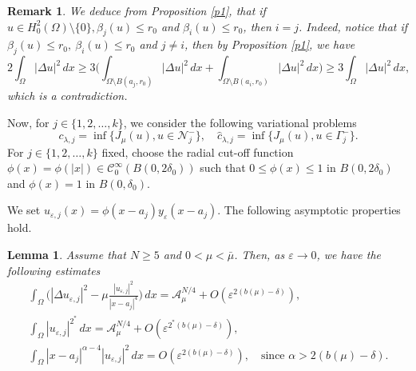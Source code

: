 \documentclass[10pt,a4paper]{amsart}
\numberwithin{equation}{section}
\newtheorem{lemma}[theorem]{Lemma}
\newtheorem{remark}[theorem]{Remark}
\begin{document}
 \begin{remark}\label{RM} \rm
We deduce from Proposition \ref{p1}, that if 
\(u\in H^2_0(\Omega)\setminus\{0\}, \beta_j(u)\leq r_0\)  and \(\beta_i(u)\leq r_0\),
then \(i=j\). Indeed, notice that if \( \beta_j(u)\leq r_0, \ \beta_i(u)\leq r_0\) 
and \(j\neq i\), then by Proposition \ref{p1}, we have
 \[
 2\int_{\Omega} |\Delta u|^2\,dx 
 \geq 3 \Big( \int_{\Omega \setminus B(a_j, r_0)} |\Delta u|^2\,dx
 +\int_{\Omega \setminus B(a_i, r_0)} |\Delta u|^2\,dx\Big) 
 \geq 3\int_{\Omega} |\Delta u|^2\,dx,
 \]
which is a contradiction.
\end{remark}

 Now, for \(j\in \{1,2,\dots,k\}\), we consider the following variational problems
\[
 c_{\lambda, j}=\inf \{J_{\mu}(u), u\in \mathcal{N}_j^-\}, \quad
  \hat{c}_{\lambda, j}=\inf \{J_{\mu}(u), u\in \Gamma_j^-\}.
\]
For \(j\in \{1,2,\dots,k\}\) fixed, choose the radial cut-off function 
\(\phi(x)=\phi(|x|)\in \mathcal{C}^{\infty}_0(B(0,2\delta _0))\) such that 
\(0\leq \phi(x)\leq 1\) in \(B(0, 2\delta_0)\) and \(\phi(x)=1\) in \(B(0, \delta_0)\).

We set \(u_{\varepsilon, j}(x)= \phi(x-a_j) y_\varepsilon(x-a_j)\). 
The following asymptotic properties hold.

\begin{lemma}
Assume that \(N\geq 5\) and \(0<\mu<\bar {\mu}\). Then, as \(\varepsilon \to 0\), we
have the following estimates
\begin{gather} \label{a0}
 \int_{\Omega}\Big( |\Delta u_{\varepsilon, j}|^2-\mu \frac{|u_{\varepsilon, j}
  |^2}{|x-a_j|^4}\Big)\,dx =\mathcal{A}_{\mu}^{N/4}+O(\varepsilon^{2(b(\mu)
  -\delta)}), \\ 
  \label{a1}
  \int_{\Omega}| u_{\varepsilon, j}|^{2^*}\,dx =\mathcal{A}_{\mu}^{N/4}
  +O(\varepsilon^{2^*(b(\mu)-\delta)}), \\ 
  \label{a2}
  \int_{\Omega} |x-a_j|^{\alpha-4}| u_{\varepsilon, j}|^2\,dx 
  =O(\varepsilon^{2(b(\mu)-\delta)}), \quad \text{since }  \alpha> 2(b(\mu)-\delta).
\end{gather}
\end{lemma}
\end{document}
